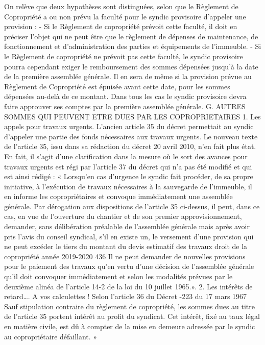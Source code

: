 On relève que deux hypothèses sont distinguées, selon que le Règlement de Copropriété a ou non prévu la faculté pour le syndic provisoire d’appeler une provision :
- Si le Règlement de copropriété prévoit cette faculté, il doit en préciser l’objet qui ne peut être que le règlement de dépenses de maintenance, de fonctionnement et d’administration des parties et équipements de l’immeuble.
- Si le Règlement de copropriété ne prévoit pas cette faculté, le syndic provisoire pourra cependant exiger le remboursement des sommes dépensées jusqu’à la date de la première assemblée générale. Il en sera de même si la provision prévue au Règlement de Copropriété est épuisée avant cette date, pour les sommes dépensées au-delà de ce montant.
Dans tous les cas le syndic provisoire devra faire approuver ses comptes par la première assemblée générale.
G. AUTRES SOMMES QUI PEUVENT ETRE DUES PAR LES COPROPRIETAIRES
1. Les appels pour travaux urgents.
L’ancien article 35 du décret permettait au syndic d’appeler une partie des fonds nécessaires aux travaux urgents. Le nouveau texte de l’article 35, issu dans sa rédaction du décret 20 avril 2010, n’en fait plus état.
En fait, il s’agit d’une clarification dans la mesure où le sort des avances pour travaux urgents est régi par l’article 37 du décret qui n’a pas été modifié et qui est ainsi rédigé :
« Lorsqu'en cas d'urgence le syndic fait procéder, de sa propre initiative, à l'exécution de travaux nécessaires à la sauvegarde de l'immeuble, il en informe les copropriétaires et convoque immédiatement une assemblée générale.
Par dérogation aux dispositions de l'article 35 ci-dessus, il peut, dans ce cas, en vue de l'ouverture du chantier et de son premier approvisionnement, demander, sans délibération préalable de l'assemblée générale mais après avoir pris l'avis du conseil syndical, s'il en existe un, le versement d'une provision qui ne peut excéder le tiers du montant du devis estimatif des travaux
droit de la copropriété année 2019-2020
436
Il ne peut demander de nouvelles provisions pour le paiement des travaux qu'en vertu d'une décision de l'assemblée générale qu'il doit convoquer immédiatement et selon les modalités prévues par le deuxième alinéa de l'article 14-2 de la loi du 10 juillet 1965.».
2. Les intérêts de retard…. A vos calculettes !
Selon l'article 36 du Décret -223 du 17 mars 1967
Sauf stipulation contraire du règlement de copropriété, les sommes dues au titre de l'article 35 portent intérêt au profit du syndicat. Cet intérêt, fixé au taux légal en matière civile, est dû à compter de la mise en demeure adressée par le syndic au copropriétaire défaillant. »

